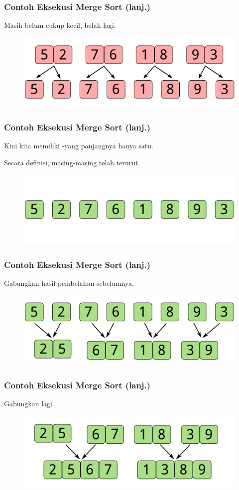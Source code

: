 \begin{frame}
\frametitle{Contoh Eksekusi Merge Sort (lanj.)}
Masih belum cukup kecil, belah lagi.
\begin{figure}
  \centering
  \includegraphics[width=10 cm]{asset/merge-sort-demo-3.pdf}
\end{figure}
\end{frame}

\begin{frame}
\frametitle{Contoh Eksekusi Merge Sort (lanj.)}
Kini kita memiliki \farray-\farray yang panjangnya hanya satu.\newline

Secara definisi, masing-masing \farray telah terurut.
\begin{figure}
  \centering
  \includegraphics[width=10 cm]{asset/merge-sort-demo-4.pdf}
\end{figure}
\end{frame}

\begin{frame}
\frametitle{Contoh Eksekusi Merge Sort (lanj.)}
Gabungkan hasil pembelahan sebelumnya.
\begin{figure}
  \centering
  \includegraphics[width=10 cm]{asset/merge-sort-demo-5.pdf}
\end{figure}
\end{frame}

\begin{frame}
\frametitle{Contoh Eksekusi Merge Sort (lanj.)}
Gabungkan lagi.
\begin{figure}
  \centering
  \includegraphics[width=10 cm]{asset/merge-sort-demo-6.pdf}
\end{figure}
\end{frame}

